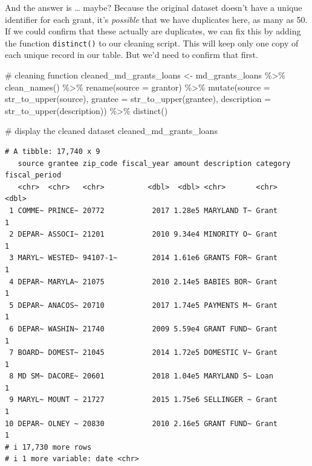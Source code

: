 \documentclass[
  letterpaper,
  DIV=11,
  numbers=noendperiod]{scrreprt}
\newenvironment{Shaded}{\begin{snugshade}}{\end{snugshade}}
\newcommand{\AttributeTok}[1]{\textcolor[rgb]{0.40,0.45,0.13}{#1}}
\newcommand{\CommentTok}[1]{\textcolor[rgb]{0.37,0.37,0.37}{#1}}
\newcommand{\FunctionTok}[1]{\textcolor[rgb]{0.28,0.35,0.67}{#1}}
\newcommand{\NormalTok}[1]{\textcolor[rgb]{0.00,0.23,0.31}{#1}}
\newcommand{\OtherTok}[1]{\textcolor[rgb]{0.00,0.23,0.31}{#1}}
\newcommand{\SpecialCharTok}[1]{\textcolor[rgb]{0.37,0.37,0.37}{#1}}
\begin{document}
And the answer is \ldots{} maybe? Because the original dataset doesn't
have a unique identifier for each grant, it's \emph{possible} that we
have duplicates here, as many as 50. If we could confirm that these
actually are duplicates, we can fix this by adding the function
\texttt{distinct()} to our cleaning script. This will keep only one copy
of each unique record in our table. But we'd need to confirm that first.

\begin{Shaded}
\begin{Highlighting}[]
\CommentTok{\# cleaning function}
\NormalTok{cleaned\_md\_grants\_loans }\OtherTok{\textless{}{-}}\NormalTok{ md\_grants\_loans }\SpecialCharTok{\%\textgreater{}\%}
  \FunctionTok{clean\_names}\NormalTok{() }\SpecialCharTok{\%\textgreater{}\%} 
  \FunctionTok{rename}\NormalTok{(}\AttributeTok{source =}\NormalTok{ grantor) }\SpecialCharTok{\%\textgreater{}\%} 
  \FunctionTok{mutate}\NormalTok{(}\AttributeTok{source =} \FunctionTok{str\_to\_upper}\NormalTok{(source), }\AttributeTok{grantee =} \FunctionTok{str\_to\_upper}\NormalTok{(grantee), }\AttributeTok{description =} \FunctionTok{str\_to\_upper}\NormalTok{(description)) }\SpecialCharTok{\%\textgreater{}\%} 
  \FunctionTok{distinct}\NormalTok{()}

\CommentTok{\# display the cleaned dataset}
\NormalTok{cleaned\_md\_grants\_loans}
\end{Highlighting}
\end{Shaded}

\begin{verbatim}
# A tibble: 17,740 x 9
   source grantee zip_code fiscal_year amount description category fiscal_period
   <chr>  <chr>   <chr>          <dbl>  <dbl> <chr>       <chr>            <dbl>
 1 COMME~ PRINCE~ 20772           2017 1.28e5 MARYLAND T~ Grant                1
 2 DEPAR~ ASSOCI~ 21201           2010 9.34e4 MINORITY O~ Grant                1
 3 MARYL~ WESTED~ 94107-1~        2014 1.61e6 GRANTS FOR~ Grant                1
 4 DEPAR~ MARYLA~ 21075           2010 2.14e5 BABIES BOR~ Grant                1
 5 DEPAR~ ANACOS~ 20710           2017 1.74e5 PAYMENTS M~ Grant                1
 6 DEPAR~ WASHIN~ 21740           2009 5.59e4 GRANT FUND~ Grant                1
 7 BOARD~ DOMEST~ 21045           2014 1.72e5 DOMESTIC V~ Grant                1
 8 MD SM~ DACORE~ 20601           2018 1.04e5 MARYLAND S~ Loan                 1
 9 MARYL~ MOUNT ~ 21727           2015 1.75e6 SELLINGER ~ Grant                1
10 DEPAR~ OLNEY ~ 20830           2010 2.16e5 GRANT FUND~ Grant                1
# i 17,730 more rows
# i 1 more variable: date <chr>
\end{verbatim}
\end{document}
